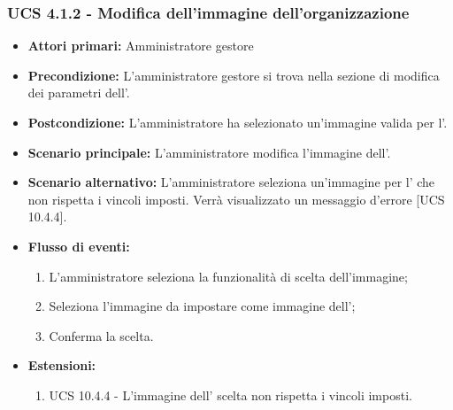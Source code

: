 \subsubsection{UCS 4.1.2 - Modifica dell'immagine dell'organizzazione}%
\begin{itemize}
	\item \textbf{Attori primari:} Amministratore gestore
	\item \textbf{Precondizione:} L'amministratore gestore si trova nella sezione di modifica dei parametri dell'.
	\item \textbf{Postcondizione:} L'amministratore ha selezionato un'immagine valida per l'.
	\item \textbf{Scenario principale:} L'amministratore modifica l'immagine dell'.
	\item \textbf{Scenario alternativo:} L'amministratore seleziona un'immagine per l' che non rispetta i vincoli imposti. Verrà visualizzato un messaggio d'errore [UCS 10.4.4].
	\item \textbf{Flusso di eventi:}
	\begin{enumerate}
		\item L'amministratore seleziona la funzionalità di scelta dell'immagine;
		\item Seleziona l'immagine da impostare come immagine dell';
		\item Conferma la scelta.
	\end{enumerate}
	\item \textbf{Estensioni:}
	\begin{enumerate}
		\item UCS 10.4.4 - L'immagine dell' scelta non rispetta i vincoli imposti.
	\end{enumerate}
\end{itemize}

